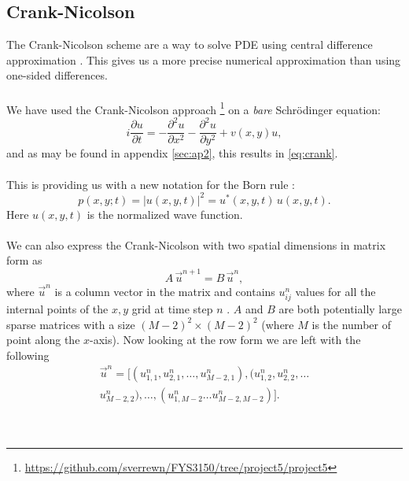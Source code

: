 \documentclass[english,notitlepage,reprint,nofootinbib]{revtex4-1}  %
\begin{document}
	\subsection{Crank-Nicolson}
	
	The Crank-Nicolson scheme are a way to solve PDE using central difference approximation \cite{PetterLangtangenHans2016FDCw}. This gives us a more precise numerical approximation than using one-sided differences. 
	\\
	\\
	
	We have used the Crank-Nicolson approach \footnote{\url{https://github.com/sverrewn/FYS3150/tree/project5/project5}} on a \textit{bare} Schrödinger equation:
	\begin{equation} \label{eq:partial}
		i \frac{\partial u}{\partial t} = - \frac{\partial^2 u}{\partial x^2} - \frac{\partial^2 u}{\partial y^2} + v(x,y)u,
	\end{equation}
	and as may be found in appendix \ref{sec:ap2}, this results in \ref{eq:crank}.
	\\
	\\
	
	This is providing us with a new notation for the Born rule \cite{comphys_assign}:
	\begin{equation}
		p(x,y;t) = |u(x,y,t)|^2 = u^*(x,y,t) \, u(x,y,t).
	\end{equation}
	Here $u(x,y,t)$ is the normalized wave function.
	\\
	\\
	
	We can also express the Crank-Nicolson with two spatial dimensions in matrix form as
	\begin{equation}
		A \,\vec{u}^{n+1} = B \,\vec{u}^{n},
	\end{equation}
	where $\vec{u}^n$ is a column vector in the matrix and contains $u^n_{ij}$ values for all the internal points of the $x,y$ grid at time step $n$ \cite{comphys_assign}. $A$ and $B$ are both potentially large sparse matrices with a size $(M-2)^2 \times (M-2)^2$ (where $M$ is the number of point along the $x$-axis). Now looking at the row form we are left with the following
	\begin{equation}
		\begin{split}
			\vec{u}^n = [(u_{1,1}^n, u_{2,1}^n, \ldots, u_{M-2,1}^n), (u_{1,2}^n, u_{2,2}^n, \ldots \\ u_{M-2,2}^n), \ldots, (u_{1,M-2}^n \ldots u_{M-2,M-2}^n)].
		\end{split}
	\end{equation}
	\\
	\\
	
\end{document}
